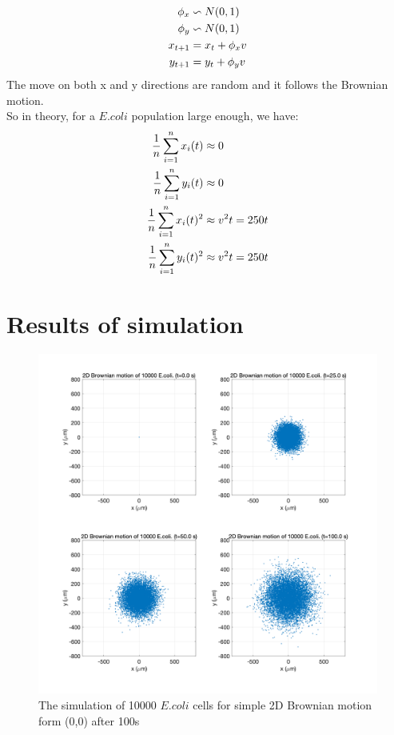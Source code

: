 \begin{equation*} 
\begin{aligned} 
\centering
\phi_x &\backsim N(0,1) \\
\phi_y &\backsim N(0,1) \\
x_{t+1}  &=  x_{t} + \phi_x v \\ 
y_{t+1}  &=  y_{t} + \phi_y v \\ 
\end{aligned} 
\end{equation*}
The move on both x and y directions are random and it follows the Brownian motion.\\
So in theory, for a $E.coli$ population large enough, we have: \\
\begin{equation*} 
\begin{aligned} 
\centering
\frac{1}{n} \sum_{i=1}^{n}x_i(t)   &\approx 0 \\
\frac{1}{n} \sum_{i=1}^{n}y_i(t)   &\approx 0 \\
\frac{1}{n} \sum_{i=1}^{n}x_i(t)^2 &\approx v^2t  = 250t \\
\frac{1}{n} \sum_{i=1}^{n}y_i(t)^2 &\approx v^2t  = 250t \\
\end{aligned} 
\end{equation*}
\section{Results of simulation}

\begin{figure}[H]
\centering
\includegraphics[width=1\linewidth]{Figures/P1_fig1.png}
\caption{The simulation of 10000 $E.coli$ cells for simple 2D Brownian motion form (0,0) after 100s}
\label{P1_fig1}
\end{figure}

